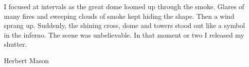 \epigraph{I focused at intervals as the great dome loomed up through the smoke. Glares of many fires and sweeping clouds of smoke kept hiding the shape. Then a wind sprang up. Suddenly, the shining cross, dome and towers stood out like a symbol in the inferno. The scene was unbelievable. In that moment or two I released my shutter.}{Herbert Mason}
